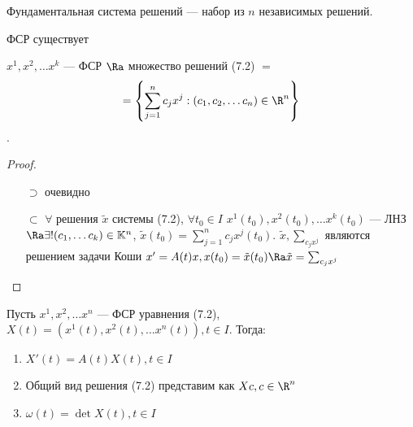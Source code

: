 \begin{definition}
    Фундаментальная система решений --- набор из \(n\) независимых решений.
\end{definition}

\begin{proposition}
    ФСР существует
\end{proposition}

\begin{proposition}
    \(x^1, x^2, \dots x^k\) --- ФСР \(\Ra\) множество решений (7.2) \(=\)
    \[= \left\{ \sum_{j = 1}^n c_jx^j: (c_1, c_2, \dots c_n) \in \R^n \right\}\].
\end{proposition}
\begin{proof}\indent
    \begin{enumerate}
        \item[\(\supset\)] очевидно
        \item[\(\subset\)] \(\forall\) решения \(\tilde{x}\) системы (7.2), \(\forall t_0 \in I\)
        \(x^1(t_0), x^2(t_0), \dots x^k(t_0)\) --- ЛНЗ \(\Ra \exists ! (c_1, \dots c_k) \in \mathbb{K}^n\), \(\tilde{x}(t_0) = \sum_{j = 1}^nc_jx^j(t_0)\).
        \(\tilde{x}, \sum_{c_jx^j}\) являются решением задачи Коши \(x' = A(t)x, x(t_0) = \tilde{x}(t_0)\Ra \tilde{x} = \sum_{c_jx^j}\) 
    \end{enumerate}
\end{proof}

\begin{note}
    Пусть \(x^1, x^2, \dots x^n\) --- ФСР уравнения (7.2), \(X(t) = (x^1(t), x^2(t), \dots x^n(t)), t \in I\). Тогда:
    \begin{enumerate}
        \item \(X'(t) = A(t)X(t), t \in I\)
        \item Общий вид решения (7.2) представим как \(Xc, c \in \R^n\)
        \item \(\omega(t) = \det X(t), t \in I\)
    \end{enumerate}
\end{note}

